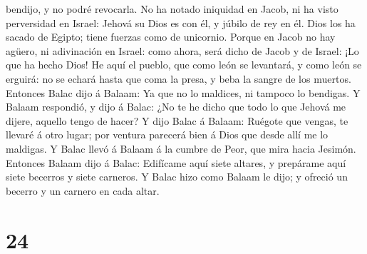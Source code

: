 bendijo, y no podré revocarla.  No ha notado iniquidad en
Jacob, ni ha visto perversidad en Israel: Jehová su Dios es con él, y
júbilo de rey en él.  Dios los ha sacado de Egipto; tiene
fuerzas como de unicornio.  Porque en Jacob no hay
agüero, ni adivinación en Israel: como ahora, será dicho de Jacob y de
Israel: ¡Lo que ha hecho Dios!  He aquí el pueblo, que
como león se levantará, y como león se erguirá: no se echará hasta que
coma la presa, y beba la sangre de los muertos.  Entonces
Balac dijo á Balaam: Ya que no lo maldices, ni tampoco lo bendigas.
 Y Balaam respondió, y dijo á Balac: ¿No te he dicho que
todo lo que Jehová me dijere, aquello tengo de hacer?  Y
dijo Balac á Balaam: Ruégote que vengas, te llevaré á otro lugar; por
ventura parecerá bien á Dios que desde allí me lo maldigas.
 Y Balac llevó á Balaam á la cumbre de Peor, que mira
hacia Jesimón.  Entonces Balaam dijo á Balac: Edifícame
aquí siete altares, y prepárame aquí siete becerros y siete carneros.
 Y Balac hizo como Balaam le dijo; y ofreció un becerro y
un carnero en cada altar.

\hypertarget{section-23}{%
\section{24}\label{section-23}}

